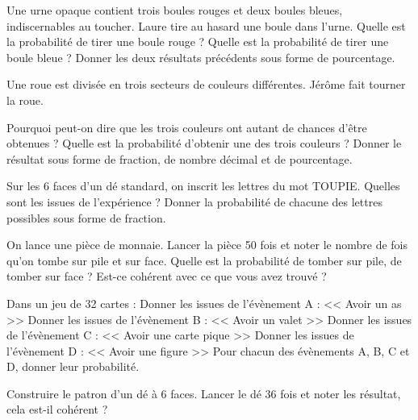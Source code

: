 \documentclass[../Cours.tex]{subfiles}
\begin{document}
\begin{questions}
    \exercice Une urne opaque contient trois boules rouges et deux boules bleues, indiscernables au toucher. Laure tire au hasard une boule dans l'urne.
    \question Quelle est la probabilité de tirer une boule rouge ?
    \question Quelle est la probabilité de tirer une boule bleue ?
    \question Donner les deux résultats précédents sous forme de pourcentage.
    
    \exercice Une roue est divisée en trois secteurs de couleurs différentes. Jérôme fait tourner la roue.
    
    \question Pourquoi peut-on dire que les trois couleurs ont autant de chances d'être obtenues ?
    \question Quelle est la probabilité d'obtenir une des trois couleurs ? Donner le résultat sous forme de fraction, de nombre décimal et de pourcentage.
    
    
    \begin{center}
    \end{center}
    
    \exercice Sur les 6 faces d'un dé standard, on inscrit les lettres du mot TOUPIE.
    \question Quelles sont les issues de l'expérience ?
    \question Donner la probabilité de chacune des lettres possibles sous forme de fraction.
    
    \exercice On lance une pièce de monnaie. 
    \question Lancer la pièce 50 fois et noter le nombre de fois qu'on tombe sur pile et sur face.
    \question Quelle est la probabilité de tomber sur pile, de tomber sur face ?
    \question Est-ce cohérent avec ce que vous avez trouvé ?
    
    \exercice Dans un jeu de 32 cartes :
    \question Donner les issues de l'évènement A : << Avoir un as >>
    \question Donner les issues de l'évènement B : << Avoir un valet >>
    \question Donner les issues de l'évènement C : << Avoir une carte pique >>
    \question Donner les issues de l'évènement D : << Avoir une figure >>
    \question Pour chacun des évènements A, B, C et D, donner leur probabilité.
    
    \exercice 
    \question Construire le patron d'un dé à 6 faces.
    \question Lancer le dé 36 fois et noter les résultat, cela est-il cohérent ?


\end{questions}
\end{document}
